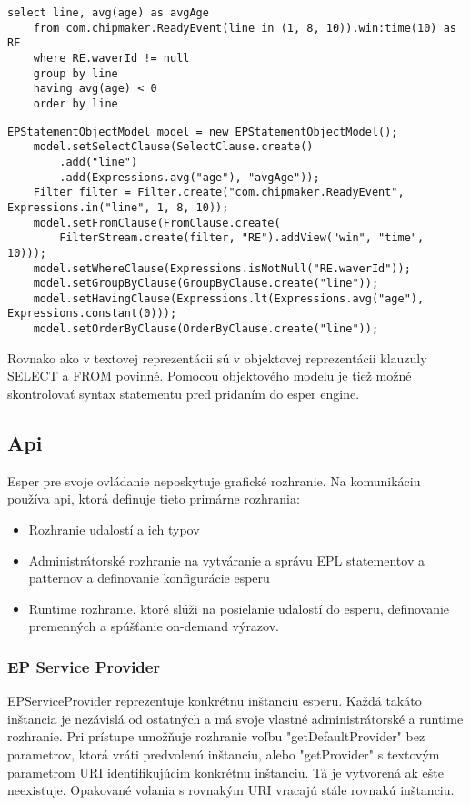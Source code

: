 		\begin{lstlisting}[label=lst:epl-nomodel,caption=EPL statement bez použitia objektového modelu]
	select line, avg(age) as avgAge 
	from com.chipmaker.ReadyEvent(line in (1, 8, 10)).win:time(10) as RE
	where RE.waverId != null
	group by line 
	having avg(age) < 0
	order by line
		\end{lstlisting}
		
		\begin{lstlisting}[float,label=lst:epl-model,caption=EPL statement s použitím objektového modelu]
	EPStatementObjectModel model = new EPStatementObjectModel();
	model.setSelectClause(SelectClause.create()
		.add("line")
		.add(Expressions.avg("age"), "avgAge"));
	Filter filter = Filter.create("com.chipmaker.ReadyEvent", Expressions.in("line", 1, 8, 10));
	model.setFromClause(FromClause.create(
		FilterStream.create(filter, "RE").addView("win", "time", 10)));
	model.setWhereClause(Expressions.isNotNull("RE.waverId"));
	model.setGroupByClause(GroupByClause.create("line"));
	model.setHavingClause(Expressions.lt(Expressions.avg("age"), Expressions.constant(0)));
	model.setOrderByClause(OrderByClause.create("line"));
		\end{lstlisting}
	
		Rovnako ako v textovej reprezentácii sú v objektovej reprezentácii klauzuly SELECT a FROM povinné. Pomocou objektového modelu je tiež možné skontrolovať syntax statementu pred pridaním do esper engine.
		
	\subsection{Api}
		Esper pre svoje ovládanie neposkytuje grafické rozhranie. Na komunikáciu používa api, ktorá definuje tieto primárne rozhrania:
		\begin{itemize}
			\item Rozhranie udalostí a ich typov
			\item Administrátorské rozhranie na vytváranie a správu EPL statementov a patternov a definovanie konfigurácie esperu
			\item Runtime rozhranie, ktoré slúži na posielanie udalostí do esperu, definovanie premenných a spúšťanie on-demand výrazov.
		\end{itemize}
		
		\subsubsection{EP Service Provider}
		EPServiceProvider reprezentuje konkrétnu inštanciu esperu. Každá takáto inštancia je nezávislá od ostatných a má svoje vlastné administrátorské a runtime rozhranie. Pri prístupe umožňuje rozhranie voľbu "getDefaultProvider" bez parametrov, ktorá vráti predvolenú inštanciu, alebo "getProvider" s textovým parametrom URI identifikujúcim konkrétnu inštanciu. Tá je vytvorená ak ešte neexistuje. Opakované volania s rovnakým URI vracajú stále rovnakú inštanciu.
		
